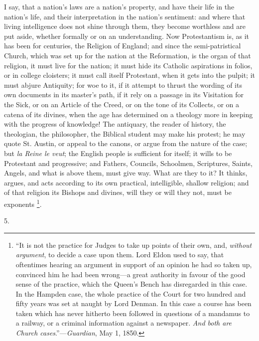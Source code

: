 I say, that a nation's laws are a nation's property, and have their
life in the nation's life, and their interpretation in the nation's
sentiment: and where that living intelligence does not shine through
them, they become worthless and are put aside, whether formally or on
an understanding. Now Protestantism is, as it has been for centuries,
the Religion of England; and since the semi-patristical Church, which
was set up for the nation at the Reformation, is the organ of that
religion, it must live for the nation; it must hide its Catholic
aspirations in folios, or in college cloisters; it must call itself
Protestant, when it gets into the pulpit; it must abjure Antiquity;
for woe to it, if it attempt to thrust the wording of its own
documents in its master's path, if it rely on a passage in its
Visitation for the Sick, or on an Article of the Creed, or on the tone
of its Collects, or on a catena of its divines, when the age has
determined on a theology more in keeping with the progress of
knowledge! The antiquary, the reader of history, the theologian, the
philosopher, the Biblical student may make his protest; he may quote
St. Austin, or appeal to the canons, or argue from the nature of the
case; but \emph{la Reine le veut}; the English people is sufficient
for itself; it wills to be Protestant and progressive; and Fathers,
Councils, Schoolmen, Scriptures, Saints, Angels, and what is above
them, must give way. What are they to it? It thinks, argues, and acts
according to its own practical, intelligible, shallow religion; and of
that religion its Bishops and divines, will they or will they not,
must be exponents \footnote{``It is not the practice for Judges to
take up points of their own, and, \emph{without argument}, to decide a
case upon them. Lord Eldon used to say, that oftentimes hearing an
argument in support of an opinion he had so taken up, convinced him he
had been wrong—a great authority in favour of the good sense of the
practice, which the Queen's Bench has disregarded in this case. In the
Hampden case, the whole practice of the Court for two hundred and
fifty years was set at naught by Lord Denman. In this case a course
has been taken which has never hitherto been followed in questions of
a mandamus to a railway, or a criminal information against a
newspaper. \emph{And both are Church cases}.''—\emph{Guardian},
May 1, 1850.}.

5.

